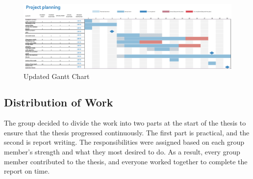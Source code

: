 \vspace{2mm}
\begin{figure}[H]
    \centering
    \includegraphics[width=1\columnwidth]{Images/finished-gantt.png}
    \caption{Updated Gantt Chart}
    \label{fig: Updated Gantt Chart}
\end{figure}


\subsection{Distribution of Work}
The group decided to divide the work into two parts at the start of the thesis to ensure that the thesis progressed continuously. The first part is practical, and the second is report writing. The responsibilities were assigned based on each group member's strength and what they most desired to do. As a result, every group member contributed to the thesis, and everyone worked together to complete the report on time. 

